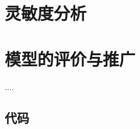\documentclass{cumcmthesis}
\begin{document}
\section{灵敏度分析}

\section{模型的评价与推广}

\begin{thebibliography}{99}%

     ....

\end{thebibliography}

\begin{appendices}

\section{代码}
%

\end{appendices}
\end{document}
